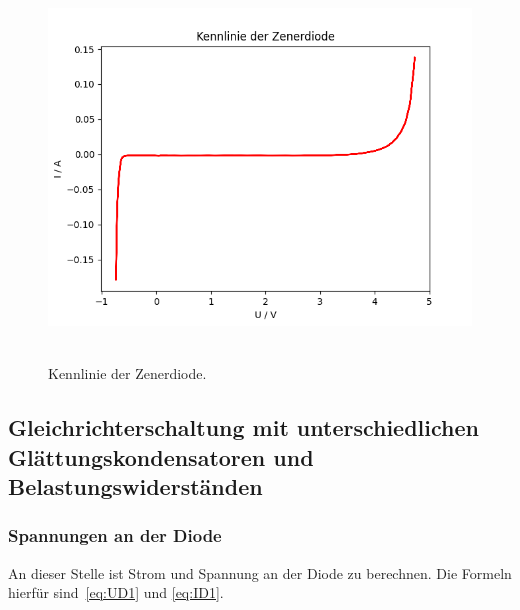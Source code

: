 \documentclass{article}
\begin{document}
\begin{figure}[H]
\caption{Kennlinie der Zenerdiode.}
\label{fig:task2_auswertung2}
{\centering
\includegraphics[scale=0.6]{bilder/task2_IU.png}
~
}
\end{figure}



\subsection{Gleichrichterschaltung mit unterschiedlichen Glättungskondensatoren und Belastungswiderständen}


\subsubsection{Spannungen an der Diode}
An dieser Stelle ist Strom und Spannung an der Diode zu berechnen. Die Formeln hierfür sind~\eqref{eq:UD1} und \eqref{eq:ID1}.
\end{document}
